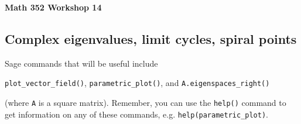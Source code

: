 \documentclass[12pt,twoside]{exam}
\begin{document}
\noindent
\textbf{{\large Math 352 \hfill Workshop 14}}

\vspace{2ex}

\noindent
{}

\noindent

\newcommand{\longlines}{\setlength{\answerlinelength}{0.7\linewidth}}
\newcommand{\medlines}{\setlength{\answerlinelength}{0.45\linewidth}}
\newcommand{\shortlines}{\setlength{\answerlinelength}{0.2\linewidth}}

\RenewDocumentCommand{}

\subsection*{Complex eigenvalues, limit cycles, spiral points}

Sage commands that will be useful include

\texttt{plot\_vector\_field()}, \texttt{parametric\_plot()}, and
\texttt{A.eigenspaces\_right()} 

(where \texttt{A} is a square matrix).
Remember, you can use the \texttt{help()} command to get information on
any of these commands, e.g. \texttt{help(parametric\_plot)}.
\end{document}
